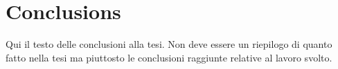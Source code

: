 \chapter*{Conclusions}

Qui il testo delle conclusioni alla tesi. Non deve essere un riepilogo di quanto fatto nella tesi ma piuttosto le conclusioni raggiunte relative al lavoro svolto.